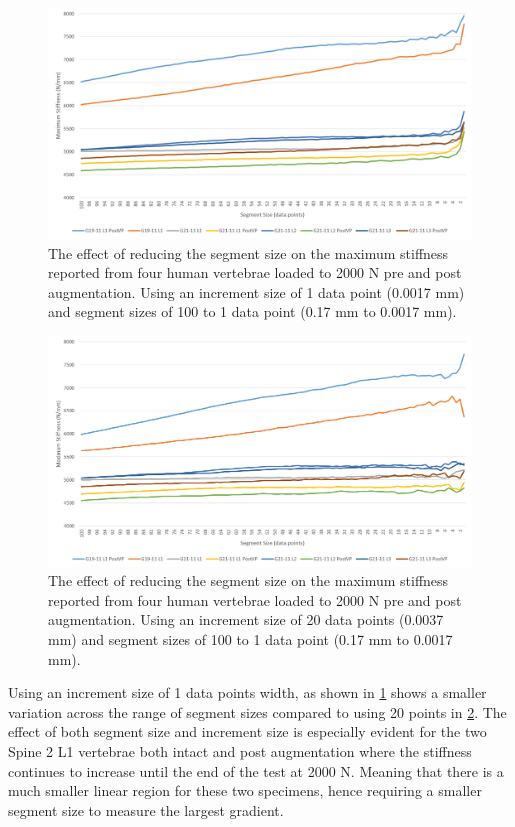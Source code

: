 \begin{figure}[ht!]
  \centering
  \includegraphics[width=6in]{Chapters/Chapter_HT_images/findStiffness_1incr.png}
  \caption{The effect of reducing the segment size on the maximum stiffness
    reported from four human vertebrae loaded to 2000 N pre and post
    augmentation. Using an increment size of 1 data point (0.0017 mm) and
    segment sizes of 100 to 1 data point (0.17 mm to 0.0017 mm).}
  \label{fig:findStiffness_1incr}
\end{figure}

\begin{figure}[ht!]
  \centering
  \includegraphics[width=6in]{Chapters/Chapter_HT_images/findStiffness_20incr.png}
  \caption{The effect of reducing the segment size on the maximum stiffness
    reported from four human vertebrae loaded to 2000 N pre and post
    augmentation. Using an increment size of 20 data points (0.0037 mm) and
    segment sizes of 100 to 1 data point (0.17 mm to 0.0017 mm).}
  \label{fig:findStiffness_20incr}
\end{figure}

Using an increment size of 1 data points width, as shown in \cref{fig:findStiffness_1incr} shows a smaller variation across the range of
segment sizes compared to using 20 points in \cref{fig:findStiffness_20incr}. The effect of both segment size and increment
size is especially evident for the two Spine 2 L1 vertebrae both intact and post
augmentation where the stiffness continues to increase until the end of the test
at 2000 N. Meaning that there is a much smaller linear region for these two
specimens, hence requiring a smaller segment size to measure the largest
gradient.

